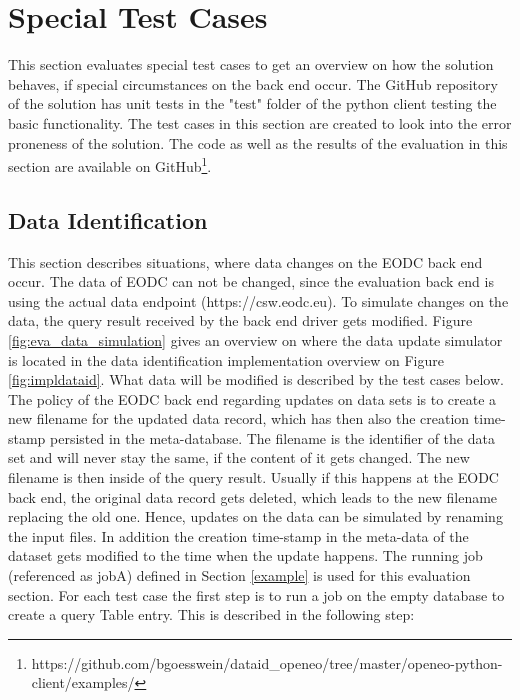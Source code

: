 \documentclass[draft,final]{vutinfth} %
\begin{document}
\section{Special Test Cases}\label{Evaluation:special}
This section evaluates special test cases to get an overview on how the solution behaves, if special circumstances on the back end occur. The GitHub repository of the solution has unit tests in the "test" folder of the python client testing the basic functionality. The test cases in this section are created to look into the error proneness of the solution. The code as well as the results of the evaluation in this section are available on GitHub\footnote{https://github.com/bgoesswein/dataid\_openeo/tree/master/openeo-python-client/examples/}.
\subsection{Data Identification}\label{Evaluation:special_dataid}
This section describes situations, where data changes on the EODC back end occur. The data of EODC can not be changed, since the evaluation back end is using the actual data endpoint (https://csw.eodc.eu). To simulate changes on the data, the query result received by the back end driver gets modified. Figure \ref{fig:eva_data_simulation} gives an overview on where the data update simulator is located in the data identification implementation overview on Figure \ref{fig:impldataid}. What data will be modified is described by the test cases below. The policy of the EODC back end regarding updates on data sets is to create a new filename for the updated data record, which has then also the creation time-stamp persisted in the meta-database. The filename is the identifier of the data set and will never stay the same, if the content of it gets changed. The new filename is then inside of the query result. Usually if this happens at the EODC back end, the original data record gets deleted, which leads to the new filename replacing the old one. Hence, updates on the data can be simulated by renaming the input files. In addition the creation time-stamp in the meta-data of the dataset gets modified to the time when the update happens. The running job (referenced as jobA) defined in Section \ref{example} is used for this evaluation section. For each test case the first step is to run a job on the empty database to create a query Table entry. This is described in the following step: \\
\end{document}
